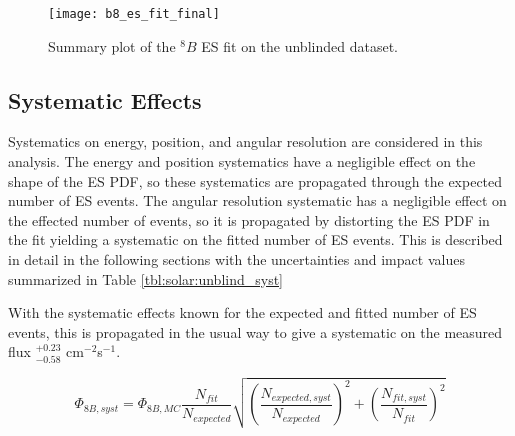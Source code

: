 \begin{figure}
\centering
\texttt{[image: b8\_es\_fit\_final]}
\caption{Summary plot of the $^8B$ ES fit on the unblinded dataset.}
\label{fig:solar:unblind_fit}
\end{figure}


\subsection{Systematic Effects}

Systematics on energy, position, and angular resolution are considered in this 
analysis. 
The energy and position systematics have a negligible effect on the shape of 
the ES PDF, so these systematics are propagated through the expected number of 
ES events. 
The angular resolution systematic has a negligible effect on the effected 
number of events, so it is propagated by distorting the ES PDF in the 
fit yielding a systematic on the fitted number of ES events.
This is described in detail in the following sections with the uncertainties 
and  impact values summarized in Table \ref{tbl:solar:unblind_syst}

With the systematic effects known for the expected and fitted number of ES
events, this is propagated in the usual way to give a systematic on the 
measured flux $^{+0.23}_{-0.58}$ cm$^{-2}$s$^{-1}$.

\begin{equation}
\Phi_{8B,syst} = \Phi_{8B,MC}\frac{N_{fit}}{N_{expected}} \sqrt{
    \left(\frac{N_{expected,syst}}{N_{expected}}\right)^2 +
    \left(\frac{N_{fit,syst}}{N_{fit}}\right)^2
    }
\end{equation}

